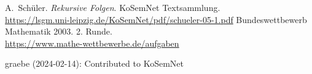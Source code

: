 \documentclass[11pt,a4paper]{article}
\begin{document}
\begin{thebibliography}{Wor77}

 A.~Schüler.  \newblock \emph{Rekursive Folgen}.
  \newblock KoSemNet Textsammlung.\\
  \url{https://lsgm.uni-leipzig.de/KoSemNet/pdf/schueler-05-1.pdf}
 Bundeswettbewerb Mathematik 2003. 2. Runde.\\
  \url{https://www.mathe-wettbewerbe.de/aufgaben}

\end{thebibliography}

\begin{attribution}
graebe (2024-02-14): Contributed to KoSemNet
\end{attribution}

 
\end{document}
